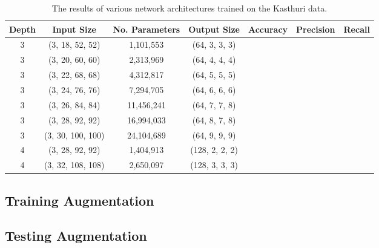 \begin{table}
	\scriptsize
	\centering
	\begin{tabular}{c c c c c c c}
		\hline
		\textbf{Depth} & \textbf{Input Size} & \textbf{No. Parameters} & \textbf{Output Size} & \textbf{Accuracy} & \textbf{Precision} & \textbf{Recall} \\ \hline
		      3        & (3, 18, 52, 52)     & 1,101,553               & (64, 3, 3, 3)        &                   &                    &  \\
		      3        & (3, 20, 60, 60)     & 2,313,969               & (64, 4, 4, 4)        &                   &                    &  \\
		      3        & (3, 22, 68, 68)     & 4,312,817               & (64, 5, 5, 5)        &                   &                    &  \\
		      3        & (3, 24, 76, 76)     & 7,294,705               & (64, 6, 6, 6)        &                   &                    &  \\
		      3        & (3, 26, 84, 84)     & 11,456,241              & (64, 7, 7, 8)        &                   &                    &  \\
		      3        & (3, 28, 92, 92)     & 16,994,033              & (64, 8, 7, 8)        &                   &                    &  \\
		      3        & (3, 30, 100, 100)   & 24,104,689              & (64, 9, 9, 9)        &                   &                    &  \\
		      4        & (3, 28, 92, 92)     & 1,404,913               & (128, 2, 2, 2)       &                   &                    &  \\
		      4        & (3, 32, 108, 108)   & 2,650,097               & (128, 3, 3, 3)       &                   &                    &  \\ \hline
	\end{tabular}
	\caption{The results of various network architectures trained on the Kasthuri data.}
	\label{table:input-size}
\end{table}


\subsection{Training Augmentation}

\subsection{Testing Augmentation}